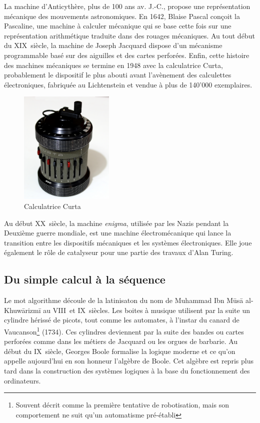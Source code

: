 \documentclass[a4paper,11pt]{book}
\begin{document}
La machine d'Anticythère, plus de 100 ans av. J.-C., propose une représentation mécanique des mouvements astronomiques. En 1642, Blaise Pascal conçoit la Pascaline, une machine à calculer mécanique qui se base cette fois sur une représentation arithmétique traduite dans des rouages mécaniques. Au tout début du \textsc{XIX}\ieme ~siècle, la machine de Joseph Jacquard dispose  d'un mécanisme programmable basé sur des aiguilles et des cartes perforées. Enfin, cette histoire des machines mécaniques se termine en 1948 avec la calculatrice Curta, probablement le dispositif le plus abouti avant l'avènement des calculettes électroniques, fabriquée au Lichtenstein et vendue à plus de 140'000 exemplaires.

\begin{figure} %
    \centering
    \includegraphics[width=0.4\textwidth]{media/machines/Curta_II_Mechanical_Calculator.jpeg}
    \caption{Calculatrice Curta}
    \centering
\end{figure}

Au début \textsc{XX}\ieme~siècle, la machine \textit{enigma}, utilisée par les Nazis pendant la Deuxième guerre mondiale, est une machine électromécanique qui lance la transition entre les dispositifs mécaniques et les systèmes électroniques. Elle joue également le rôle de catalyseur pour une partie des travaux d'Alan Turing.
\subsection{Du simple calcul à la séquence}
Le mot algorithme découle de la latinisaton du nom de Muhammad Ibn Mūsā al-Khuwārizmī au \textsc{VIII}\ieme~et \textsc{IX}\ieme~siècles. Les boites à musique utilisent par la suite un cylindre hérissé de picots, tout comme les automates, à l'instar du canard de Vaucanson\footnote{Souvent décrit comme la première tentative de robotisation, mais son comportement ne suit qu'un automatisme pré-établi} (1734). Ces cylindres deviennent par la suite des bandes ou cartes perforées comme dans les métiers de Jacquard ou les orgues de barbarie.
Au début du \textsc{IX}\ieme~siècle, Georges Boole formalise la logique moderne et ce qu'on appelle aujourd'hui en son honneur l'algèbre de Boole. Cet algèbre est repris plus tard dans la construction des systèmes logiques à la base du fonctionnement des ordinateurs.
\end{document}
